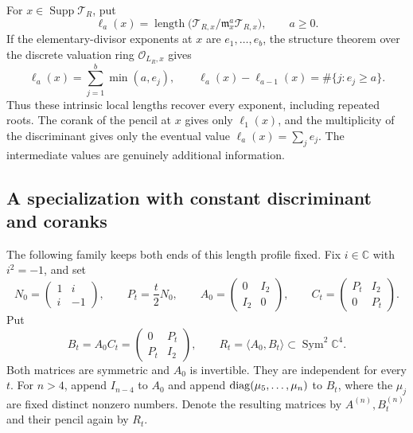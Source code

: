 \documentclass[11pt,reqno]{amsart}
\numberwithin{equation}{section}
\theoremstyle{definition}\newtheorem{definition}[theorem]{Definition}
\theoremstyle{remark}\newtheorem{remark}[theorem]{Remark}
\newcommand{\C}{\mathbb C}\newcommand{\Q}{\mathbb Q}
\newcommand{\OO}{\mathcal O}\newcommand{\II}{\mathcal I}
\DeclareMathOperator{\Sym}{Sym}\DeclareMathOperator{\Gr}{Gr}
\DeclareMathOperator{\Supp}{Supp}\DeclareMathOperator{\Hilb}{Hilb}
\DeclareMathOperator{\length}{length}
\begin{document}
For \(x\in\Supp\mathcal T_R\), put
\begin{equation}\label{eq:spectral-length-profile}
 \ell_a(x)=\length\bigl(\mathcal T_{R,x}/
                  \mathfrak m_x^a\mathcal T_{R,x}\bigr),
 \qquad a\ge0.
\end{equation}
If the elementary-divisor exponents at \(x\) are
\(e_1,\ldots,e_b\), the structure theorem over the discrete
valuation ring \(\OO_{L_R,x}\) gives
\begin{equation}\label{eq:spectral-partition-inversion}
 \ell_a(x)=\sum_{j=1}^b\min(a,e_j),\qquad
 \ell_a(x)-\ell_{a-1}(x)=\#\{j:e_j\ge a\}.
\end{equation}
Thus these intrinsic local lengths recover every exponent, including
repeated roots.  The corank of the pencil at \(x\) gives only
\(\ell_1(x)\), and the multiplicity of the discriminant gives
only the eventual value \(\ell_a(x)=\sum_j e_j\).  The
intermediate values are genuinely additional information.

\subsection{A specialization with constant discriminant and coranks}

The following family keeps both ends of this length profile fixed.
Fix \(i\in\C\) with \(i^2=-1\), and set
\begin{equation}\label{eq:rank-preserving-four-block}
 N_0=\begin{pmatrix}1&i\\i&-1\end{pmatrix},\qquad
 P_t=\frac t2N_0,\qquad
 A_0=\begin{pmatrix}0&I_2\\I_2&0\end{pmatrix},\qquad
 C_t=\begin{pmatrix}P_t&I_2\\0&P_t\end{pmatrix}.
\end{equation}
Put
\begin{equation}\label{eq:symmetric-specialization-pair}
 B_t=A_0C_t=\begin{pmatrix}0&P_t\\P_t&I_2\end{pmatrix},
 \qquad R_t=\langle A_0,B_t\rangle\subset\Sym^2\C^4.
\end{equation}
Both matrices are symmetric and \(A_0\) is invertible.  They
are independent for every \(t\).  For \(n>4\), append
\(I_{n-4}\) to \(A_0\) and append
\(\operatorname{diag}(\mu_5,\ldots,\mu_n)\) to \(B_t\), where the
\(\mu_j\) are fixed distinct nonzero numbers.  Denote the resulting
matrices by \(A^{(n)},B_t^{(n)}\) and their pencil again by \(R_t\).
\end{document}
